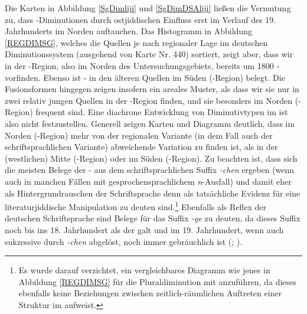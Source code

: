 Die Karten in Abbildung \ref{SgDimliji} und \ref{SgDimDSAliji} ließen die Vermutung zu, dass -Di\-mi\-nu\-tio\-nen durch ostjiddischen Einfluss erst im Verlauf des 19. Jahrhunderts im Norden auftauchen. Das Histogramm in Abbildung \ref{REGDIMSG}, welches die Quellen je nach regionaler Lage im deutschen Diminutionssystem (ausgehend von  Karte Nr. 440) sortiert, zeigt aber, dass wir in der -Region, also im Norden des Untersuchungsgebiets, bereits um 1800 - vorfinden. Ebenso ist - in den älteren Quellen im Süden (-Region) belegt.\label{LKinberlin} Die Fusionsformen  hingegen zeigen insofern ein areales Muster, als dass wir sie nur in zwei relativ jungen Quellen in der -Region finden, und sie besonders im Norden (-Region) frequent sind. Eine diachrone Entwicklung von Diminutivtypen im  ist also nicht festzustellen. Generell zeigen Karten und Diagramm deutlich, dass im Norden (-Region) mehr von der regionalen Variante (in dem Fall auch der schriftsprachlichen Variante) abweichende Variation zu finden ist, als in der (westlichen) Mitte (-Region) oder im Süden (-Region). Zu beachten ist, dass sich die meisten Belege der - aus dem schriftsprachlichen Suffix \textit{-chen} ergeben (wenn auch in manchen Fällen mit gesprochensprachlichem \textit{n}-Ausfall) und damit eher als Hintergrundrauschen der Schriftsprache denn als tatsächliche Evidenz für eine literaturjiddische Manipulation zu deuten sind.\footnote{Es wurde darauf verzichtet, ein vergleichbares Diagramm wie jenes in Abbildung \ref{REGDIMSG} für die Pluraldiminution mit anzuführen, da dieses ebenfalls keine Beziehungen zwischen zeitlich-räumlichen Auftreten einer Struktur im  aufweist.}\label{sgDIMimNordenmehr} Ebenfalls als Reflex der deutschen Schriftsprache sind Belege für das Suffix \textit{-ge} zu deuten, da dieses Suffix noch bis ins 18. Jahrhundert als  der  galt und im 19. Jahrhundert, wenn auch sukzessive durch \textit{-chen} abgelöst, noch immer gebräuchlich ist (\citealt{Wegera2000b}; \citealt[73f]{Elspass2005}).


		 

 

